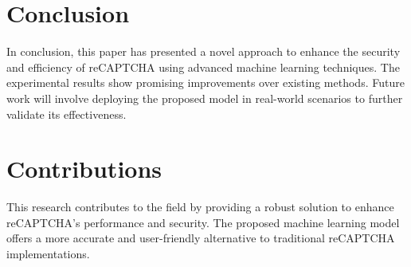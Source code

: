 \documentclass{article}
\begin{document}
\section{Conclusion}
In conclusion, this paper has presented a novel approach to enhance the security and efficiency of reCAPTCHA using advanced machine learning techniques. The experimental results show promising improvements over existing methods. Future work will involve deploying the proposed model in real-world scenarios to further validate its effectiveness.

\section{Contributions}
This research contributes to the field by providing a robust solution to enhance reCAPTCHA's performance and security. The proposed machine learning model offers a more accurate and user-friendly alternative to traditional reCAPTCHA implementations.
\end{document}
